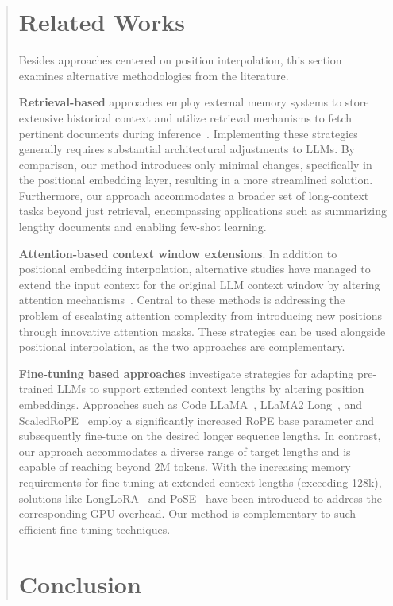 \begin{abstract}
\section{Related Works}

Besides approaches centered on position interpolation, this section examines alternative methodologies from the literature.

\textbf{Retrieval-based} approaches employ external memory systems to store extensive historical context and utilize retrieval mechanisms to fetch pertinent documents during inference~\cite{longllama,wang2023augmenting,borgeaud2022improving}. Implementing these strategies generally requires substantial architectural adjustments to LLMs. By comparison, our method introduces only minimal changes, specifically in the positional embedding layer, resulting in a more streamlined solution. Furthermore, our approach accommodates a broader set of long-context tasks beyond just retrieval, encompassing applications such as summarizing lengthy documents and enabling few-shot learning.

\textbf{Attention-based context window extensions}. In addition to positional embedding interpolation, alternative studies have managed to extend the input context for the original LLM context window by altering attention mechanisms~\cite{han2023lminfinite, streamingllm,parallelwindow}. Central to these methods is addressing the problem of escalating attention complexity from introducing new positions through innovative attention masks. These strategies can be used alongside positional interpolation, as the two approaches are complementary.

\textbf{Fine-tuning based approaches} investigate strategies for adapting pre-trained LLMs to support extended context lengths by altering position embeddings. Approaches such as Code LLaMA~\cite{codellama}, LLaMA2 Long~\cite{xiong2023effective}, and ScaledRoPE~\cite{liu2023scaling} employ a significantly increased RoPE base parameter and subsequently fine-tune on the desired longer sequence lengths. In contrast, our approach accommodates a diverse range of target lengths and is capable of reaching beyond 2M tokens. With the increasing memory requirements for fine-tuning at extended context lengths (exceeding 128k), solutions like LongLoRA~\cite{longlora} and PoSE~\cite{zhu2023pose} have been introduced to address the corresponding GPU overhead. Our method is complementary to such efficient fine-tuning techniques.

\section{Conclusion}


\end{abstract}

